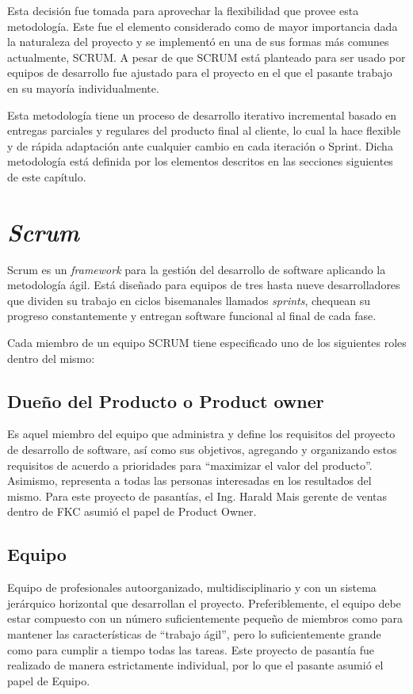 Esta decisión fue tomada para aprovechar la flexibilidad que provee esta metodología. Este fue el elemento considerado como de mayor importancia dada la naturaleza del proyecto y se implementó en una de sus formas más comunes actualmente, SCRUM. A pesar de que SCRUM está planteado para ser usado por equipos de desarrollo fue ajustado para el proyecto en el que el pasante trabajo en su mayoría individualmente.

Esta metodología tiene un proceso de desarrollo iterativo incremental basado en entregas parciales y regulares del producto final al cliente, lo cual la hace flexible y de rápida adaptación ante cualquier cambio en cada iteración o Sprint. Dicha metodología está definida por los elementos descritos en las secciones siguientes de este capítulo.

\section{\emph{Scrum}}

Scrum es un \emph{framework} para la gestión del desarrollo de software aplicando la metodología ágil. Está diseñado para equipos de tres hasta nueve desarrolladores que dividen su trabajo en ciclos bisemanales llamados \emph{sprints}, chequean su progreso constantemente y entregan software funcional al final de cada fase.

Cada miembro de un equipo SCRUM tiene especificado uno de los siguientes roles dentro del mismo:

\subsection{Dueño del Producto o Product owner}
Es aquel miembro del equipo que administra y define los requisitos del proyecto de desarrollo de software, así como sus objetivos, agregando y organizando estos requisitos de acuerdo a prioridades para “maximizar el valor del producto”. Asimismo, representa a todas las personas interesadas en los resultados del mismo.
Para este proyecto de pasantías, el Ing. Harald Mais gerente de ventas dentro de FKC asumió el papel de Product Owner.

\subsection{Equipo}
Equipo de profesionales autoorganizado, multidisciplinario y con un sistema jerárquico horizontal que desarrollan el proyecto. Preferiblemente, el equipo debe estar compuesto con un número suficientemente pequeño de miembros como para mantener las características de “trabajo ágil”, pero lo suficientemente grande como para cumplir a tiempo todas las tareas.
Este proyecto de pasantía fue realizado de manera estrictamente individual, por lo que el pasante asumió el papel de Equipo.

